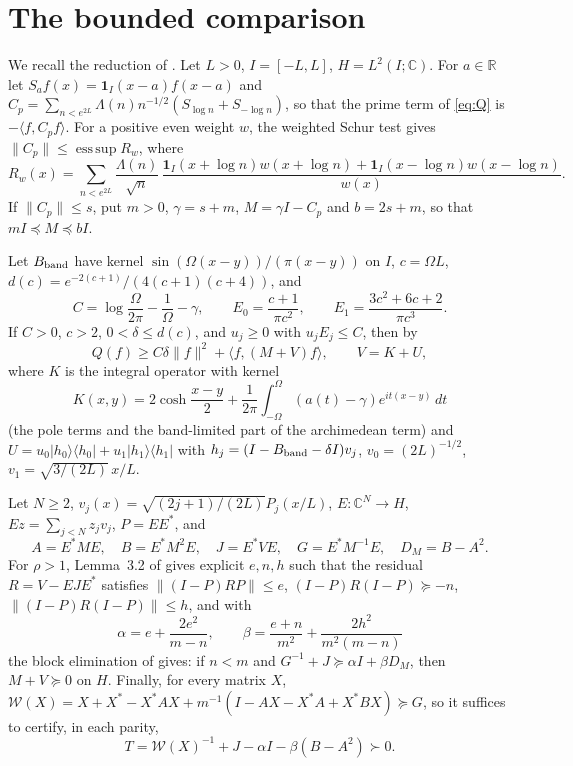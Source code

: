 \documentclass[11pt]{amsart}
\theoremstyle{remark}
\numberwithin{equation}{section}
\newcommand{\R}{\mathbb{R}}
\newcommand{\C}{\mathbb{C}}
\begin{document}
\section{The bounded comparison}\label{sec:tail}
We recall the reduction of \cite[Section~3]{MoriVII}. Let $L>0$, $I=[-L,L]$, $H=L^2(I;\C)$. For $a\in\R$ let $S_af(x)=\mathbf 1_I(x-a)f(x-a)$ and $C_p=\sum_{n<e^{2L}}\Lambda(n)n^{-1/2}(S_{\log n}+S_{-\log n})$, so that the prime term of \eqref{eq:Q} is $-\langle f,C_pf\rangle$. For a positive even weight $w$, the weighted Schur test gives $\|C_p\|\le\operatorname{ess\,sup}R_w$, where
\[
R_w(x)=\sum_{n<e^{2L}}\frac{\Lambda(n)}{\sqrt n}\,\frac{\mathbf 1_I(x+\log n)w(x+\log n)+\mathbf 1_I(x-\log n)w(x-\log n)}{w(x)} .
\]
If $\|C_p\|\le s$, put $m>0$, $\gamma=s+m$, $M=\gamma I-C_p$ and $b=2s+m$, so that $mI\preceq M\preceq bI$.

Let $B_{\rm band}$ have kernel $\sin(\Omega(x-y))/(\pi(x-y))$ on $I$, $c=\Omega L$, $d(c)=e^{-2(c+1)}/(4(c+1)(c+4))$, and
\[
C=\log\frac\Omega{2\pi}-\frac1\Omega-\gamma,\qquad E_0=\frac{c+1}{\pi c^2},\qquad E_1=\frac{3c^2+6c+2}{\pi c^3}.
\]
If $C>0$, $c>2$, $0<\delta\le d(c)$, and $u_j\ge0$ with $u_jE_j\le C$, then by \cite[Proposition~3.1 and (3.2)]{MoriVII}
\begin{equation}\label{eq:reduction}
Q(f)\ge C\delta\|f\|^2+\langle f,(M+V)f\rangle,\qquad V=K+U,
\end{equation}
where $K$ is the integral operator with kernel
\[
K(x,y)=2\cosh\frac{x-y}{2}+\frac1{2\pi}\int_{-\Omega}^{\Omega}(a(t)-\gamma)e^{it(x-y)}\,dt
\]
(the pole terms and the band-limited part of the archimedean term) and $U=u_0|h_0\rangle\langle h_0|+u_1|h_1\rangle\langle h_1|$ with $h_j=(I-B_{\rm band}-\delta I)v_j$, $v_0=(2L)^{-1/2}$, $v_1=\sqrt{3/(2L)}\,x/L$.

Let $N\ge2$, $v_j(x)=\sqrt{(2j+1)/(2L)}P_j(x/L)$, $E:\C^N\to H$, $Ez=\sum_{j<N}z_jv_j$, $P=EE^*$, and
\[
A=E^*ME,\quad B=E^*M^2E,\quad J=E^*VE,\quad G=E^*M^{-1}E,\quad D_M=B-A^2 .
\]
For $\rho>1$, Lemma~3.2 of \cite{MoriVII} gives explicit $e,n,h$ such that the residual $R=V-EJE^*$ satisfies $\|(I-P)RP\|\le e$, $(I-P)R(I-P)\succeq-n$, $\|(I-P)R(I-P)\|\le h$, and with
\[
\alpha=e+\frac{2e^2}{m-n},\qquad\beta=\frac{e+n}{m^2}+\frac{2h^2}{m^2(m-n)}
\]
the block elimination of \cite[(3.3)]{MoriVII} gives: if $n<m$ and $G^{-1}+J\succeq\alpha I+\beta D_M$, then $M+V\succeq0$ on $H$. Finally, for every matrix $X$, $\mathcal W(X)=X+X^*-X^*AX+m^{-1}(I-AX-X^*A+X^*BX)\succeq G$, so it suffices to certify, in each parity,
\begin{equation}\label{eq:T}
T=\mathcal W(X)^{-1}+J-\alpha I-\beta(B-A^2)\succ0 .
\end{equation}
\end{document}
